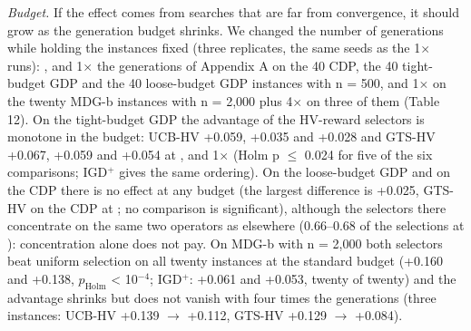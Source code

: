 \emph{Budget.} If the effect comes from searches that are far from convergence, it should grow as the generation budget shrinks. We changed the number of generations while holding the instances fixed (three replicates, the same seeds as the 1$\times$ runs): \textonequarter{}, \textonehalf{} and 1$\times$ the generations of Appendix A on the 40 CDP, the 40 tight-budget GDP and the 40 loose-budget GDP instances with n = 500, and 1$\times$ on the twenty MDG-b instances with n = 2,000 plus 4$\times$ on three of them (Table 12). On the tight-budget GDP the advantage of the HV-reward selectors is monotone in the budget: UCB-HV +0.059, +0.035 and +0.028 and GTS-HV +0.067, +0.059 and +0.054 at \textonequarter{}, \textonehalf{} and 1$\times$ (Holm p $\leq$ 0.024 for five of the six comparisons; IGD$^{+}$ gives the same ordering). On the loose-budget GDP and on the CDP there is no effect at any budget (the largest difference is +0.025, GTS-HV on the CDP at \textonequarter{}; no comparison is significant), although the selectors there concentrate on the same two operators as elsewhere (0.66--0.68 of the selections at \textonequarter{}): concentration alone does not pay. On MDG-b with n = 2,000 both selectors beat uniform selection on all twenty instances at the standard budget (+0.160 and +0.138, $p_{\mathrm{Holm}}$ < 10$^{-4}$; IGD$^{+}$: +0.061 and +0.053, twenty of twenty) and the advantage shrinks but does not vanish with four times the generations (three instances: UCB-HV +0.139 $\rightarrow$ +0.112, GTS-HV +0.129 $\rightarrow$ +0.084).

